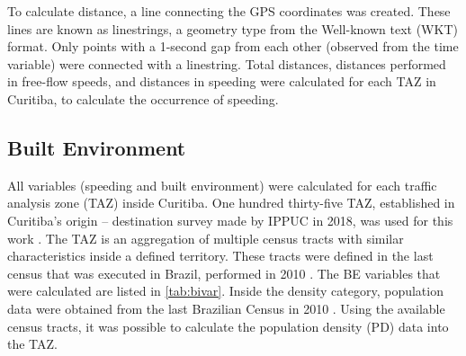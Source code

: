 
To calculate distance, a line connecting the GPS coordinates was created. These lines are known as linestrings, a geometry type from the Well-known text (WKT) format. Only points with a 1-second gap from each other (observed from the time variable) were connected with a linestring. Total distances, distances performed in free-flow speeds, and distances in speeding were calculated for each TAZ in Curitiba, to calculate the occurrence of speeding. 

\subsection{Built Environment} \label{sub:be}




All variables (speeding and built environment) were calculated for each traffic analysis zone (TAZ) inside Curitiba. One hundred thirty-five TAZ, established in Curitiba's origin – destination survey made by IPPUC in 2018, was used for this work \cite{IPPUC2018b}. The TAZ is an aggregation of multiple census tracts with similar characteristics inside a defined territory. These tracts were defined in the last census that was executed in Brazil, performed in 2010 \cite{IBGE2010}. The BE variables that were calculated are listed in \autoref{tab:bivar}. Inside the density category, population data were obtained from the last Brazilian Census in 2010 \cite{IBGE2010}. Using the available census tracts, it was possible to calculate the population density (PD) data into the TAZ. 


